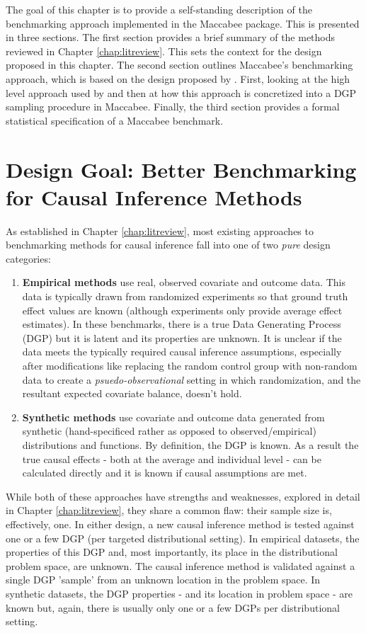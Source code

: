 \documentclass[../main.tex]{subfiles}
\begin{document}
The goal of this chapter is to provide a self-standing description of the benchmarking approach implemented in the Maccabee package. This is presented in three sections. The first section provides a brief summary of the methods reviewed in Chapter \ref{chap:litreview}. This sets the context for the design proposed in this chapter. The second section outlines Maccabee's benchmarking approach, which is based on the design proposed by \cite{Dorie2019Automated1}. First, looking at the high level approach used by \cite{Dorie2019Automated1} and then at how this approach is concretized into a DGP sampling procedure in Maccabee. Finally, the third section provides a formal statistical specification of a Maccabee benchmark.

\section{Design Goal: Better Benchmarking for Causal Inference Methods}
\label{mac:problems}

As established in Chapter \ref{chap:litreview}, most existing approaches to benchmarking methods for causal inference fall into one of two \textit{pure} design categories:

\begin{enumerate}
    \item \textbf{Empirical methods} use real, observed covariate and outcome data. This data is typically drawn from randomized experiments so that ground truth effect values are known (although experiments only provide average effect estimates). In these benchmarks, there is a true Data Generating Process (DGP) but it is latent and its properties are unknown. It is unclear if the data meets the typically required causal inference assumptions, especially after modifications like replacing the random control group with non-random data to create a \textit{psuedo-observational} setting in which randomization, and the resultant expected covariate balance, doesn't hold.
    
    \item \textbf{Synthetic methods} use covariate and outcome data generated from synthetic (hand-specificed rather as opposed to observed/empirical) distributions and functions. By definition, the DGP is known. As a result the true causal effects - both at the average and individual level - can be calculated directly and it is known if causal assumptions are met.
\end{enumerate}

While both of these approaches have strengths and weaknesses, explored in detail in Chapter \ref{chap:litreview}, they share a common flaw: their sample size is, effectively, one. In either design, a new causal inference method is tested against one or a few DGP (per targeted distributional setting). In empirical datasets, the properties of this DGP and, most importantly, its place in the distributional problem space, are unknown. The causal inference method is validated against a single DGP 'sample' from an unknown location in the problem space. In synthetic datasets, the DGP properties - and its location in problem space - are known but, again, there is usually only one or a few DGPs per distributional setting.
\end{document}

